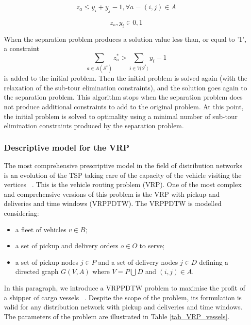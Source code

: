 \begin{equation}
z_a\le y_i+y_j-1, \forall a=\left(i,j\right)\in A
\end{equation}

\begin{equation}
z_a,y_i\in{0,1}
\end{equation}

When the separation problem produces a solution value less than, or equal to '1', a constraint 
\begin{equation}
\sum_{a\in A(S^\ast)}{z_a^\ast>\sum_{i\in{V(S}^\ast)}{y_i-1}}
\end{equation}
is added to the initial problem. Then the initial problem is solved again (with the relaxation of the sub-tour elimination constraints), and the solution goes again to the separation problem. This algorithm stops when the separation problem does not produce additional constraints to add to the original problem. At this point, the initial problem is solved to optimality using a minimal number of sub-tour elimination constraints produced by the separation problem.

\subsubsection{Descriptive model for the VRP}
The most comprehensive prescriptive model in the field of distribution networks is an evolution of the TSP taking care of the capacity of the vehicle visiting the vertices ~\cite{Accorsi2017d}. This is the vehicle routing problem (VRP). One of the most complex and comprehensive versions of this problem is the VRP with pickup and deliveries and time windows (VRPPDTW). The VRPPDTW is modelled considering:
\begin{itemize}
    \item a fleet of vehicles $v\in B$;
	\item a set of pickup and delivery orders $o\in O$ to serve;
	\item a set of pickup nodes $j\in P$ and a set of delivery nodes $j\in D$ defining a directed graph $G\left(V,A\right)$ where $V=P\bigcup D$ and $\left(i,j\right)\in A$.
\end{itemize}

In this paragraph, we introduce a VRPPDTW problem to maximise the profit of a shipper of cargo vessels ~\cite{Accorsi2018}. Despite the scope of the problem, its formulation is valid for any distribution network with pickup and deliveries and time windows. The parameters of the problem are illustrated in Table \ref{tab_VRP_vessels}.

